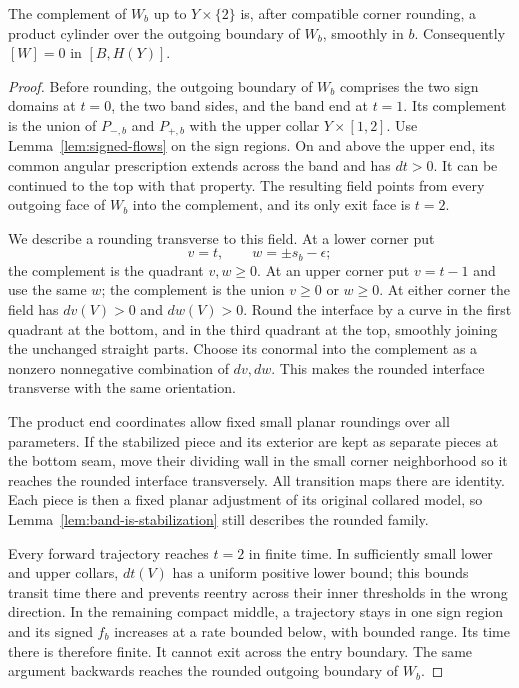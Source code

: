 \begin{lemma}\label{lem:product-complement}
The complement of $W_b$ up to $Y\times\{2\}$ is, after compatible corner rounding, a product cylinder over the outgoing boundary of $W_b$, smoothly in $b$. Consequently $[W]=0$ in $[B,H(Y)]$.
\end{lemma}

\begin{proof}
Before rounding, the outgoing boundary of $W_b$ comprises the two sign domains at $t=0$, the two band sides, and the band end at $t=1$. Its complement is the union of $P_{-,b}$ and $P_{+,b}$ with the upper collar $Y\times[1,2]$. Use Lemma~\ref{lem:signed-flows} on the sign regions. On and above the upper end, its common angular prescription extends across the band and has $dt>0$. It can be continued to the top with that property. The resulting field points from every outgoing face of $W_b$ into the complement, and its only exit face is $t=2$.

We describe a rounding transverse to this field. At a lower corner put
\[
 v=t,\qquad w=\pm s_b-\epsilon;
\]
the complement is the quadrant $v,w\geq0$. At an upper corner put $v=t-1$ and use the same $w$; the complement is the union $v\geq0$ or $w\geq0$. At either corner the field has $dv(V)>0$ and $dw(V)>0$. Round the interface by a curve in the first quadrant at the bottom, and in the third quadrant at the top, smoothly joining the unchanged straight parts. Choose its conormal into the complement as a nonzero nonnegative combination of $dv,dw$. This makes the rounded interface transverse with the same orientation.

The product end coordinates allow fixed small planar roundings over all parameters. If the stabilized piece and its exterior are kept as separate pieces at the bottom seam, move their dividing wall in the small corner neighborhood so it reaches the rounded interface transversely. All transition maps there are identity. Each piece is then a fixed planar adjustment of its original collared model, so Lemma~\ref{lem:band-is-stabilization} still describes the rounded family.

Every forward trajectory reaches $t=2$ in finite time. In sufficiently small lower and upper collars, $dt(V)$ has a uniform positive lower bound; this bounds transit time there and prevents reentry across their inner thresholds in the wrong direction. In the remaining compact middle, a trajectory stays in one sign region and its signed $f_b$ increases at a rate bounded below, with bounded range. Its time there is therefore finite. It cannot exit across the entry boundary. The same argument backwards reaches the rounded outgoing boundary of $W_b$.


\end{proof}
